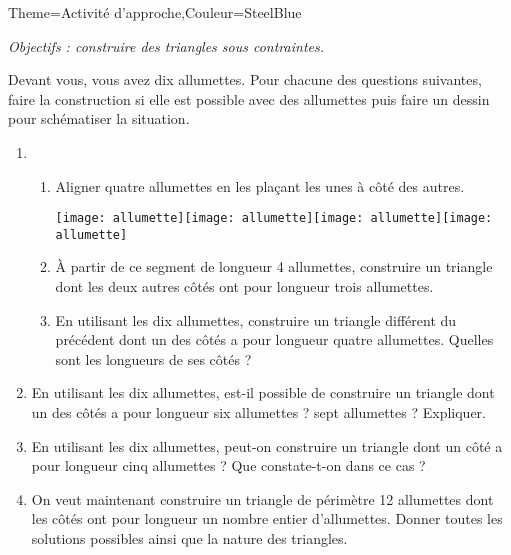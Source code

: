 \begin{Maquette}[Cours]{Theme={Activité d'approche},Couleur={SteelBlue}}


      {\it Objectifs : construire des triangles sous contraintes.}

      \begin{AActivite}

         Devant vous, vous avez dix allumettes. Pour chacune des questions suivantes, faire la construction si elle est possible avec des allumettes puis faire un dessin pour schématiser la situation.
         \begin{enumerate}
            \item
            \begin{enumerate}
               \item Aligner quatre allumettes en les plaçant les unes à côté des autres.
               \medskip
               \begin{center}
                  \texttt{[image: allumette]}\texttt{[image: allumette]}\texttt{[image: allumette]}\texttt{[image: allumette]}
               \end{center}
               \medskip
               \item À partir de ce segment de longueur 4 allumettes, construire un triangle dont les deux autres côtés ont pour longueur trois allumettes. \par \vskip2.5cm
               \item En utilisant les dix allumettes, construire un triangle différent du précédent dont un des côtés a pour longueur quatre allumettes. Quelles sont les longueurs de ses côtés ? \par \vskip2.5cm
            \end{enumerate}
            \item En utilisant les dix allumettes, est-il possible de construire un triangle dont un des côtés a pour longueur six allumettes ? sept allumettes ? Expliquer. \par \vskip2.5cm
            \item En utilisant les dix allumettes, peut-on construire un triangle dont un côté a pour longueur cinq allumettes ? Que constate-t-on dans ce cas ? \par \vskip2.5cm
            \item On veut maintenant construire un triangle de périmètre 12 allumettes dont les côtés ont pour longueur un nombre entier d'allumettes. Donner toutes les solutions possibles ainsi que la nature des triangles. \vspace*{2.5cm} 
         \end{enumerate}

   \end{AActivite}

\end{Maquette}


